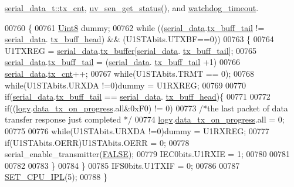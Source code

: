 \hyperlink{a00030_source_l00049}{serial\+\_\+data\+\_\+t\+::tx\+\_\+cnt}, \hyperlink{a00073_source_l00302}{uv\+\_\+sen\+\_\+get\+\_\+status()}, and \hyperlink{a00066_source_l00055}{watchdog\+\_\+timeout}.


\begin{DoxyCode}
00760 \{
00761    \hyperlink{a00072_af84840501dec18061d18a68c162a8fa2}{Uint8} dummy;
00762     \textcolor{keywordflow}{while} ((\hyperlink{a00030_a77d3b77ccd59a0065642bf1ac7887b9d}{serial\_data}.\hyperlink{a00030_a6287e1447d7902b8bbc2f6359065dcbd}{tx\_buff\_tail} != \hyperlink{a00030_a77d3b77ccd59a0065642bf1ac7887b9d}{serial\_data}.
      \hyperlink{a00030_a3e2eda0a020422511de91b2bc7386083}{tx\_buff\_head}) && (U1STAbits.UTXBF==0))
00763     \{
00764         U1TXREG = \hyperlink{a00030_a77d3b77ccd59a0065642bf1ac7887b9d}{serial\_data}.\hyperlink{a00030_a327864d2719b5145f0eded883fe321c5}{tx\_buffer}[\hyperlink{a00030_a77d3b77ccd59a0065642bf1ac7887b9d}{serial\_data}.
      \hyperlink{a00030_a6287e1447d7902b8bbc2f6359065dcbd}{tx\_buff\_tail}];
00765         \hyperlink{a00030_a77d3b77ccd59a0065642bf1ac7887b9d}{serial\_data}.\hyperlink{a00030_a6287e1447d7902b8bbc2f6359065dcbd}{tx\_buff\_tail} = (\hyperlink{a00030_a77d3b77ccd59a0065642bf1ac7887b9d}{serial\_data}.
      \hyperlink{a00030_a6287e1447d7902b8bbc2f6359065dcbd}{tx\_buff\_tail} +1)%
00766         \hyperlink{a00030_a77d3b77ccd59a0065642bf1ac7887b9d}{serial\_data}.\hyperlink{a00030_ab6b71c720d341035fb26d723364eb879}{tx\_cnt}++;
00767         \textcolor{keywordflow}{while}(U1STAbits.TRMT == 0);
00768         \textcolor{keywordflow}{while}(U1STAbits.URXDA !=0)dummy = U1RXREG;
00769 
00770         \textcolor{keywordflow}{if}(\hyperlink{a00030_a77d3b77ccd59a0065642bf1ac7887b9d}{serial\_data}.\hyperlink{a00030_a6287e1447d7902b8bbc2f6359065dcbd}{tx\_buff\_tail} == \hyperlink{a00030_a77d3b77ccd59a0065642bf1ac7887b9d}{serial\_data}.
      \hyperlink{a00030_a3e2eda0a020422511de91b2bc7386083}{tx\_buff\_head})\{
00771 
00772           \textcolor{keywordflow}{if}((\hyperlink{a00021_a2e89c46668b39a17753c238950c9e1ec}{logv}.\hyperlink{a00021_a6cdefde69642ef511e3252c38be68516}{data\_tx\_on\_progress}.all&0xF0) != 0)
00773               \textcolor{comment}{/*the last packet of data transfer response just completed */}
00774               \hyperlink{a00021_a2e89c46668b39a17753c238950c9e1ec}{logv}.\hyperlink{a00021_a6cdefde69642ef511e3252c38be68516}{data\_tx\_on\_progress}.all = 0;
00775 
00776           \textcolor{keywordflow}{while}(U1STAbits.URXDA !=0)dummy = U1RXREG;
00777           \textcolor{keywordflow}{if}(U1STAbits.OERR)U1STAbits.OERR = 0;
00778           serial\_enable\_transmitter(\hyperlink{a00040_aa93f0eb578d23995850d61f7d61c55c1}{FALSE});
00779           IEC0bits.U1RXIE = 1;
00780 
00781 
00782 
00783         \}
00784     \}
00785     IFS0bits.U1TXIF = 0;
00786 
00787     \hyperlink{a00015_a34d4c80d85281a545f3c7f1530803d65}{SET\_CPU\_IPL}(5);
00788 \}
\end{DoxyCode}


